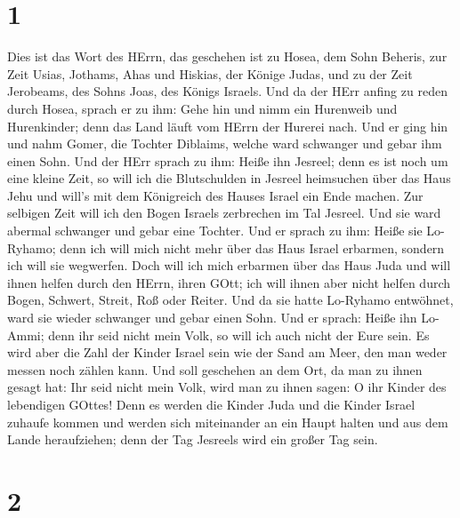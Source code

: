 \hypertarget{section}{%
\section{1}\label{section}}

 Dies ist das Wort des HErrn, das geschehen ist zu Hosea,
dem Sohn Beheris, zur Zeit Usias, Jothams, Ahas und Hiskias, der Könige
Judas, und zu der Zeit Jerobeams, des Sohns Joas, des Königs Israels.
 Und da der HErr anfing zu reden durch Hosea, sprach er zu
ihm: Gehe hin und nimm ein Hurenweib und Hurenkinder; denn das Land
läuft vom HErrn der Hurerei nach.  Und er ging hin und nahm
Gomer, die Tochter Diblaims, welche ward schwanger und gebar ihm einen
Sohn.  Und der HErr sprach zu ihm: Heiße ihn Jesreel; denn
es ist noch um eine kleine Zeit, so will ich die Blutschulden in Jesreel
heimsuchen über das Haus Jehu und will's mit dem Königreich des Hauses
Israel ein Ende machen.  Zur selbigen Zeit will ich den
Bogen Israels zerbrechen im Tal Jesreel.  Und sie ward
abermal schwanger und gebar eine Tochter. Und er sprach zu ihm: Heiße
sie Lo-Ryhamo; denn ich will mich nicht mehr über das Haus Israel
erbarmen, sondern ich will sie wegwerfen.  Doch will ich
mich erbarmen über das Haus Juda und will ihnen helfen durch den HErrn,
ihren GOtt; ich will ihnen aber nicht helfen durch Bogen, Schwert,
Streit, Roß oder Reiter.  Und da sie hatte Lo-Ryhamo
entwöhnet, ward sie wieder schwanger und gebar einen Sohn. 
Und er sprach: Heiße ihn Lo-Ammi; denn ihr seid nicht mein Volk, so will
ich auch nicht der Eure sein.  Es wird aber die Zahl der
Kinder Israel sein wie der Sand am Meer, den man weder messen noch
zählen kann. Und soll geschehen an dem Ort, da man zu ihnen gesagt hat:
Ihr seid nicht mein Volk, wird man zu ihnen sagen: O ihr Kinder des
lebendigen GOttes!  Denn es werden die Kinder Juda und die
Kinder Israel zuhaufe kommen und werden sich miteinander an ein Haupt
halten und aus dem Lande heraufziehen; denn der Tag Jesreels wird ein
großer Tag sein.

\hypertarget{section-1}{%
\section{2}\label{section-1}}

